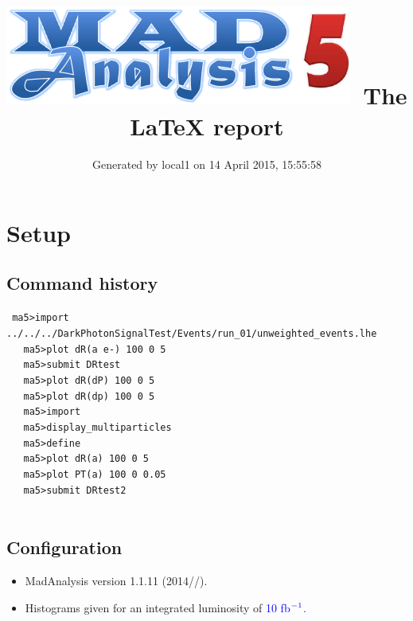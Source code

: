 \documentclass[a4paper, 11pt]{article}
\title{{\includegraphics[scale=.4]{logo.png}}\ The LaTeX report}
\author{Generated by local1 on 14 April 2015, 15:55:58}
\begin{document}
\maketitle
\flushbottom

\newpage
\section{ Setup}

\subsection{ Command history}

\texttt{ ma5>import ../\-../\-../\-DarkPhotonSignalTest/\-Events/\-run\_01/\-unweighted\_events.lhe\\
}
\texttt{ }\texttt{ }\texttt{ ma5>plot dR(a e-) 100 0 5\\
}
\texttt{ }\texttt{ }\texttt{ ma5>submit DRtest\\
}
\texttt{ }\texttt{ }\texttt{ ma5>plot dR(dP) 100 0 5\\
}
\texttt{ }\texttt{ }\texttt{ ma5>plot dR(dp) 100 0 5\\
}
\texttt{ }\texttt{ }\texttt{ ma5>import\\
}
\texttt{ }\texttt{ }\texttt{ ma5>display\_multiparticles\\
}
\texttt{ }\texttt{ }\texttt{ ma5>define\\
}
\texttt{ }\texttt{ }\texttt{ ma5>plot dR(a) 100 0 5\\
}
\texttt{ }\texttt{ }\texttt{ ma5>plot PT(a) 100 0 0.05\\
}
\texttt{ }\texttt{ }\texttt{ ma5>submit DRtest2\\
}
\texttt{ }\texttt{ }\subsection{ Configuration}

\begin{itemize}
  \item MadAnalysis version 1.1.11 (2014//).
   \item Histograms given for an integrated luminosity of \textcolor{blue}{10}\textcolor{blue}{ fb}$^{\textcolor{blue}{-1}}$\textcolor{blue}{.}
\textcolor{blue}{}
\end{itemize}
\newpage
\end{document}
